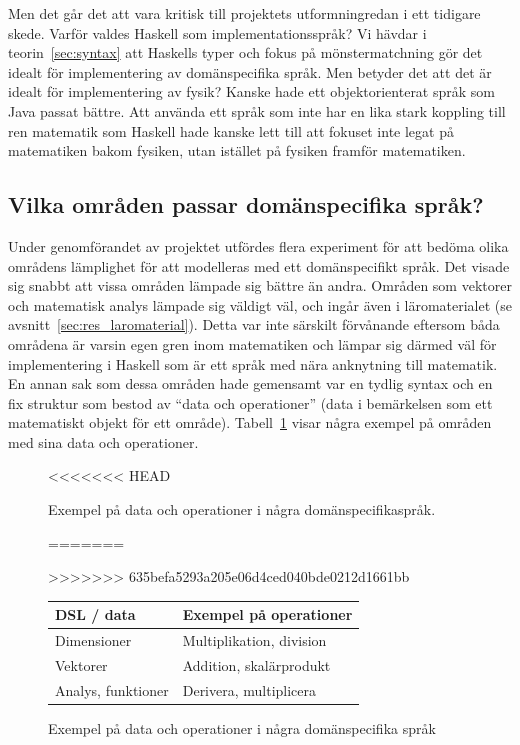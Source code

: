 Men det går det att vara kritisk till projektets utformningredan i ett tidigare
skede. Varför
valdes Haskell som implementationsspråk? Vi hävdar i teorin~\ref{sec:syntax} att
Haskells typer och fokus på mönstermatchning gör det idealt för implementering
av domänspecifika språk. Men betyder det att det är idealt för implementering
av fysik? Kanske hade ett objektorienterat språk som Java passat bättre. Att
använda ett språk som inte har en lika stark koppling till ren matematik som
Haskell hade kanske lett till att fokuset inte legat på matematiken
bakom fysiken, utan istället på fysiken framför matematiken.

\subsection{Vilka områden passar domänspecifika språk?}\label{sec:lampligt}

Under genomförandet av projektet utfördes flera experiment för att bedöma olika
områdens lämplighet för att modelleras med ett domänspecifikt språk. Det visade
sig snabbt att vissa områden lämpade sig bättre än andra. Områden
som vektorer och matematisk analys lämpade sig väldigt väl, och ingår även i
läromaterialet (se avsnitt~\ref{sec:res_laromaterial}). Detta var inte särskilt
förvånande eftersom båda områdena är varsin egen gren inom matematiken
och lämpar sig därmed väl för implementering i Haskell som är ett språk med nära
anknytning till matematik. En annan sak som dessa områden hade
gemensamt var en tydlig syntax och en fix struktur som bestod av ``data och
operationer'' (data i bemärkelsen som ett matematiskt objekt för ett område). Tabell~\ref{tab:data_och_ops} visar några exempel på områden med
sina data och operationer.

\captionsetup[figure]{name=Tabell}

\begin{figure}[tph]
\centering
<<<<<<< HEAD
\caption{Exempel på data och operationer i några domänspecifikaspråk.}\label{tab:data_och_ops}
=======
\caption{Exempel på data och operationer i några domänspecifika språk}\label{tab:data_och_ops} 
>>>>>>> 635befa5293a205e06d4ced040bde0212d1661bb
\begin{tabular}{l|l}
\toprule
DSL / data & Exempel på operationer \\ \midrule
Dimensioner & Multiplikation, division \\
Vektorer & Addition, skalärprodukt \\
Analys, funktioner & Derivera, multiplicera \\ \bottomrule
\end{tabular}
\end{figure}

